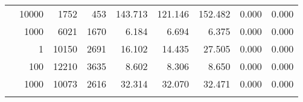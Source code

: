 \begin{table}
\begin{tabular}{rrrrrrrrr}
	            
					 &  
					 
					\multirow{ 1 }{*}{ 10000 } &
					
						
							    
							     1752  & 453  
	                           & 143.713 & 121.146 & 152.482
	                           & 0.000 & 0.000  \\
	                
	            
	        
				\noalign{\smallskip}\hline
				\multirow{ 1 }{*}{ 499999 } &
				
					
					 
					\multirow{ 1 }{*}{ 1000 } &
					
						
							    
							     6021  & 1670  
	                           & 6.184 & 6.694 & 6.375
	                           & 0.000 & 0.000  \\
	                
	            
	        
				\noalign{\smallskip}\hline
				\multirow{ 4 }{*}{ 500000 } &
				
					
					 
					\multirow{ 1 }{*}{ 1 } &
					
						
							    
							     10150  & 2691  
	                           & 16.102 & 14.435 & 27.505
	                           & 0.000 & 0.000  \\
	                
	            
					 &  
					 
					\multirow{ 1 }{*}{ 100 } &
					
						
							    
							     12210  & 3635  
	                           & 8.602 & 8.306 & 8.650
	                           & 0.000 & 0.000  \\
	                
	            
					 &  
					 
					\multirow{ 1 }{*}{ 1000 } &
					
						
							    
							     10073  & 2616  
	                           & 32.314 & 32.070 & 32.471
	                           & 0.000 & 0.000  \\
	                
	            
					 &  
					 

\end{tabular}
\end{table}
